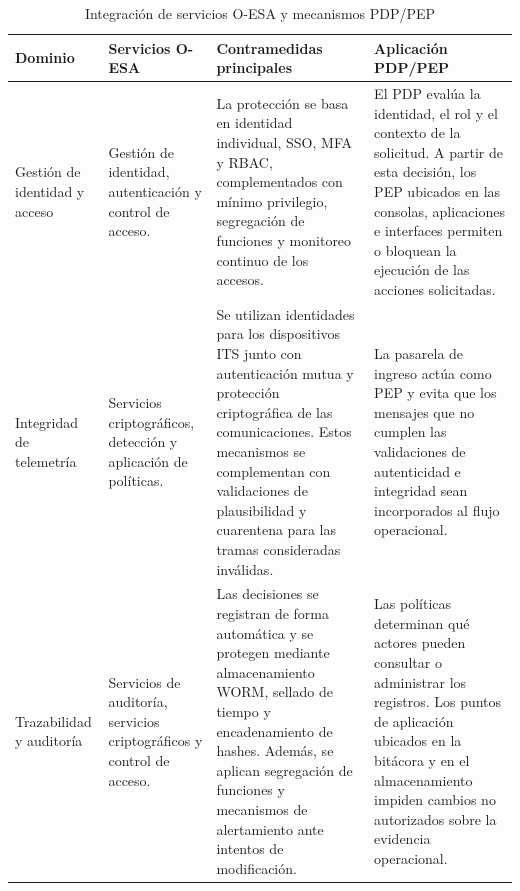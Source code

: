\begin{table}[H]
	\centering
	\caption{Integración de servicios O-ESA y mecanismos PDP/PEP}
	\label{tab:oesa_pdp_pep}
	\scriptsize
	\setlength{\tabcolsep}{3pt}
	\renewcommand{\arraystretch}{1.2}

	\begin{tabularx}{\textwidth}{
			>{\raggedright\arraybackslash}p{2.2cm}
			>{\raggedright\arraybackslash}p{2.6cm}
			>{\raggedright\arraybackslash}X
			>{\raggedright\arraybackslash}X}

		\toprule
		\textbf{Dominio}                                                                   &
		\textbf{Servicios O-ESA}                                                           &
		\textbf{Contramedidas principales}                                                 &
		\textbf{Aplicación PDP/PEP}                                                          \\
		\midrule

		Gestión de identidad y acceso                                                      &
		Gestión de identidad, autenticación y control de acceso.                           &
		La protección se basa en identidad individual, SSO, MFA y RBAC, complementados con
		mínimo privilegio, segregación de funciones y monitoreo continuo de los accesos.   &
		El PDP evalúa la identidad, el rol y el contexto de la solicitud. A partir de esta decisión,
		los PEP ubicados en las consolas, aplicaciones e interfaces permiten o bloquean la ejecución
		de las acciones solicitadas.                                                         \\

		\addlinespace

		Integridad de telemetría                                                           &
		Servicios criptográficos, detección y aplicación de políticas.                     &
		Se utilizan identidades para los dispositivos ITS junto con autenticación mutua y
		protección criptográfica de las comunicaciones. Estos mecanismos se complementan con
		validaciones de plausibilidad y cuarentena para las tramas consideradas inválidas. &
		La pasarela de ingreso actúa como PEP y evita que los mensajes que no cumplen las
		validaciones de autenticidad e integridad sean incorporados al flujo operacional.    \\

		\addlinespace

		Trazabilidad y auditoría                                                           &
		Servicios de auditoría, servicios criptográficos y control de acceso.              &
		Las decisiones se registran de forma automática y se protegen mediante almacenamiento
		WORM, sellado de tiempo y encadenamiento de hashes. Además, se aplican segregación
		de funciones y mecanismos de alertamiento ante intentos de modificación.           &
		Las políticas determinan qué actores pueden consultar o administrar los registros. Los
		puntos de aplicación ubicados en la bitácora y en el almacenamiento impiden cambios
		no autorizados sobre la evidencia operacional.                                       \\


\end{tabularx}
\end{table}
